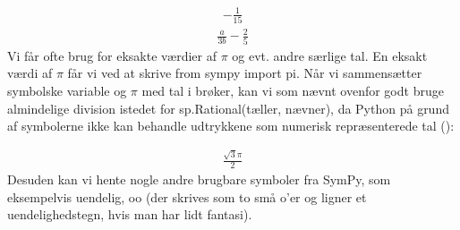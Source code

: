 \documentclass[letterpaper,10pt,english]{jupyterBook}
\begin{document}
\begin{sphinxVerbatim}[commandchars=\\\{\}]
   
   
  

   
   
  
\end{sphinxVerbatim}
\begin{equation*}
\begin{split}\displaystyle - \frac{1}{15}\end{split}
\end{equation*}\begin{equation*}
\begin{split}\displaystyle \frac{a}{3 b} - \frac{2}{5}\end{split}
\end{equation*}
Vi får ofte brug for eksakte værdier af \(\pi\) og evt. andre særlige tal. En eksakt værdi af \(\pi\) får vi ved at skrive from sympy import pi. Når vi sammensætter symbolske variable og \(\pi\) med tal i brøker, kan vi som nævnt ovenfor godt bruge almindelige division istedet for sp.Rational(tæller, nævner), da Python på grund af symbolerne ikke kan behandle udtrykkene som numerisk repræsenterede tal ():

\begin{sphinxVerbatim}[commandchars=\\\{\}]
   
      
\end{sphinxVerbatim}
\begin{equation*}
\begin{split}\displaystyle \frac{\sqrt{3} \pi}{2}\end{split}
\end{equation*}
Desuden kan vi hente nogle andre brugbare symboler fra SymPy, som eksempelvis uendelig, oo (der skrives som to små o’er og ligner et uendelighedstegn, hvis man har lidt fantasi).
\end{document}
